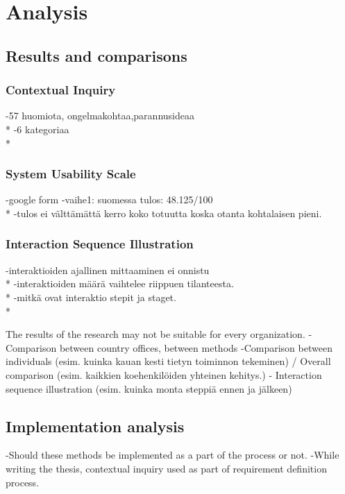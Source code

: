 \documentclass[12pt,a4paper,oneside,pdftex]{report}
\begin{document}
\chapter{Analysis}
\label{chapter:analysis}

    \section{Results and comparisons}
    \label{sec:results}
    
    \subsection{Contextual Inquiry}
    -57 huomiota, ongelmakohtaa,parannusideaa 
    \\*
    -6 kategoriaa
    \\*

    \subsection{System Usability Scale}
    -google form
     -vaihe1: suomessa tulos: 48.125/100
     \\*
     -tulos ei välttämättä kerro koko totuutta koska otanta kohtalaisen pieni.
     
     \subsection{Interaction Sequence Illustration}
     	  -interaktioiden ajallinen mittaaminen ei onnistu
	  \\*
	  -interaktioiden määrä vaihtelee riippuen tilanteesta.
	  \\*
	  -mitkä ovat interaktio stepit ja staget.
	  \\*
     
     The results of the research may not be suitable for every organization.
    -Comparison between country offices, between methods
    -Comparison between individuals (esim. kuinka kauan kesti tietyn toiminnon tekeminen) / Overall comparison (esim. kaikkien koehenkilöiden yhteinen kehitys.)
- Interaction sequence illustration (esim. kuinka monta steppiä ennen ja jälkeen)

    \section{Implementation analysis}
    \label{sec:implementationanalysis}
    -Should these methods be implemented as a part of the process or not.
    -While writing the thesis, contextual inquiry used as part of requirement definition process.
\end{document}
